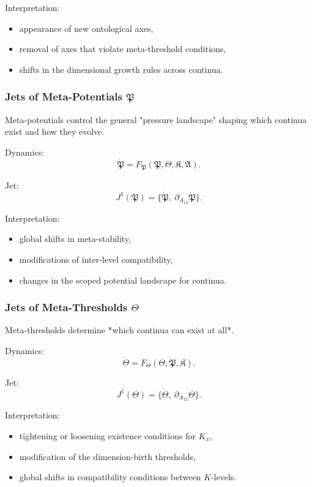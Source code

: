Interpretation:
\begin{itemize}
    \item appearance of new ontological axes,
    \item removal of axes that violate meta-threshold conditions,
    \item shifts in the dimensional growth rules across continua.
\end{itemize}


\subsubsection{Jets of Meta-Potentials $\mathfrak{P}$}

Meta-potentials control the general "pressure landscape" shaping which
continua exist and how they evolve.

Dynamics:
\[
\dot{\mathfrak{P}}
=
F_{\mathfrak{P}}(\mathfrak{P},\mathfrak{\Theta},\mathfrak{K},\mathfrak{A}).
\]

Jet:
\[
J^1(\mathfrak{P})
= \{\dot{\mathfrak{P}},\ \partial_{A_{12}}\mathfrak{P}\}.
\]

Interpretation:
\begin{itemize}
    \item global shifts in meta-stability,
    \item modifications of inter-level compatibility,
    \item changes in the scoped potential landscape for continua.
\end{itemize}


\subsubsection{Jets of Meta-Thresholds $\mathfrak{\Theta}$}

Meta-thresholds determine *which continua can exist at all*.

Dynamics:
\[
\dot{\mathfrak{\Theta}}
=
F_{\mathfrak{\Theta}}(\mathfrak{\Theta},\mathfrak{P},\mathfrak{K}).
\]

Jet:
\[
J^1(\mathfrak{\Theta})
=
\{\dot{\mathfrak{\Theta}},\ \partial_{A_{12}}\mathfrak{\Theta}\}.
\]

Interpretation:
\begin{itemize}
    \item tightening or loosening existence conditions for $K_x$,
    \item modification of the dimension-birth thresholds,
    \item global shifts in compatibility conditions between $K$-levels.
\end{itemize}


